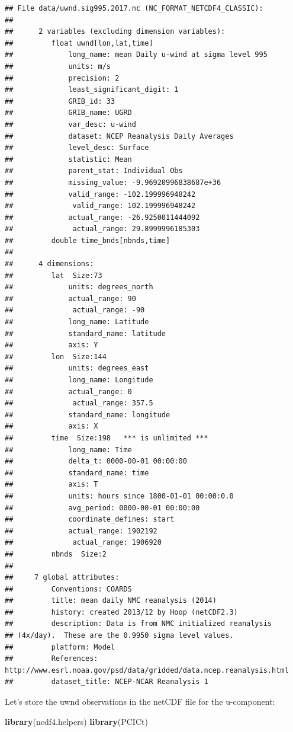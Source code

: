 \documentclass[]{book}
\newenvironment{Shaded}{\begin{snugshade}}{\end{snugshade}}
\newcommand{\KeywordTok}[1]{\textcolor[rgb]{0.13,0.29,0.53}{\textbf{{#1}}}}
\newcommand{\NormalTok}[1]{{#1}}
\theoremstyle{definition}
\theoremstyle{definition}
\theoremstyle{remark}
\begin{document}
\begin{verbatim}
## File data/uwnd.sig995.2017.nc (NC_FORMAT_NETCDF4_CLASSIC):
## 
##      2 variables (excluding dimension variables):
##         float uwnd[lon,lat,time]   
##             long_name: mean Daily u-wind at sigma level 995
##             units: m/s
##             precision: 2
##             least_significant_digit: 1
##             GRIB_id: 33
##             GRIB_name: UGRD
##             var_desc: u-wind
##             dataset: NCEP Reanalysis Daily Averages
##             level_desc: Surface
##             statistic: Mean
##             parent_stat: Individual Obs
##             missing_value: -9.96920996838687e+36
##             valid_range: -102.199996948242
##              valid_range: 102.199996948242
##             actual_range: -26.9250011444092
##              actual_range: 29.8999996185303
##         double time_bnds[nbnds,time]   
## 
##      4 dimensions:
##         lat  Size:73
##             units: degrees_north
##             actual_range: 90
##              actual_range: -90
##             long_name: Latitude
##             standard_name: latitude
##             axis: Y
##         lon  Size:144
##             units: degrees_east
##             long_name: Longitude
##             actual_range: 0
##              actual_range: 357.5
##             standard_name: longitude
##             axis: X
##         time  Size:198   *** is unlimited ***
##             long_name: Time
##             delta_t: 0000-00-01 00:00:00
##             standard_name: time
##             axis: T
##             units: hours since 1800-01-01 00:00:0.0
##             avg_period: 0000-00-01 00:00:00
##             coordinate_defines: start
##             actual_range: 1902192
##              actual_range: 1906920
##         nbnds  Size:2
## 
##     7 global attributes:
##         Conventions: COARDS
##         title: mean daily NMC reanalysis (2014)
##         history: created 2013/12 by Hoop (netCDF2.3)
##         description: Data is from NMC initialized reanalysis
## (4x/day).  These are the 0.9950 sigma level values.
##         platform: Model
##         References: http://www.esrl.noaa.gov/psd/data/gridded/data.ncep.reanalysis.html
##         dataset_title: NCEP-NCAR Reanalysis 1
\end{verbatim}

Let's store the uwnd observations in the netCDF file for the
u-component:

\begin{Shaded}
\begin{Highlighting}[]
\KeywordTok{library}\NormalTok{(ncdf4.helpers)}
\KeywordTok{library}\NormalTok{(PCICt)}
\end{Highlighting}
\end{Shaded}
\end{document}

